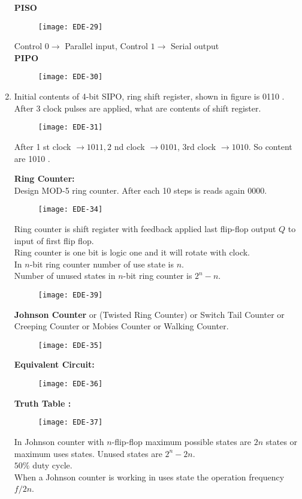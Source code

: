 \begin{enumerate}
\textbf { PISO }
\begin{figure}[H]
	\centering
	\texttt{[image: EDE-29]}
\end{figure}
Control $0 \rightarrow$ Parallel input, Control $1 \rightarrow$ Serial output\\
\textbf{ PIPO}
\begin{figure}[H]
	\centering
	\texttt{[image: EDE-30]}
\end{figure}
\item Initial contents of 4-bit SIPO, ring shift register, shown in figure is 0110 . After 3 clock pulses are applied, what are contents of shift register.
\begin{figure}[H]
	\centering
	\texttt{[image: EDE-31]}
\end{figure}
\begin{answer}
	After 1 st clock $\rightarrow 1011,2$ nd clock $\rightarrow 0101$, 3rd clock $\rightarrow 1010$. So content are 1010 .
\end{answer}
\textbf{Ring Counter:}\\
Design MOD-5 ring counter. After each 10 steps is reads again 0000.
\begin{figure}[H]
	\centering
	\texttt{[image: EDE-34]}
\end{figure}
Ring counter is shift register with feedback applied last flip-flop output $Q$ to input of first flip flop.\\
Ring counter is one bit is logic one and it will rotate with clock.\\
In $n$-bit ring counter number of use state is $n$.\\
Number of unused states in $n$-bit ring counter is $2^{n}-n$.
\begin{figure}[H]
	\centering
	\texttt{[image: EDE-39]}
\end{figure}
\textbf{Johnson Counter } or (Twisted Ring Counter) or Switch Tail Counter or Creeping Counter or Mobies Counter or Walking Counter.
\begin{figure}[H]
	\centering
	\texttt{[image: EDE-35]}
\end{figure}
\textbf { Equivalent Circuit: }
\begin{figure}[H]
	\centering
	\texttt{[image: EDE-36]}
\end{figure}
\textbf { Truth Table : }
\begin{figure}[H]
	\centering
	\texttt{[image: EDE-37]}
\end{figure}
In Johnson counter with $n$-flip-flop maximum possible states are $2 n$ states or maximum uses states. Unused states are $2^{n}-2 n$.\\
$50 \%$ duty cycle.\\
When a Johnson counter is working in uses state the operation frequency $f / 2 n$.\\
 \end{enumerate}










